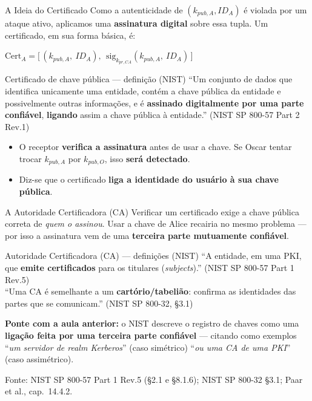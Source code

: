 \documentclass{beamer}
\begin{document}
\begin{frame}{A Ideia do Certificado}
    Como a autenticidade de $(k_{pub,A}, ID_A)$ é violada por um ataque ativo, aplicamos uma \textbf{assinatura digital} sobre essa tupla. Um certificado, em sua forma básica, é:
    \begin{tcolorbox}[colback=gray!8,colframe=gray!60!black,boxrule=0.5pt]
        \centering\footnotesize
        $\text{Cert}_A = \big[\,(k_{pub,A},\ ID_A),\ \ \mathrm{sig}_{k_{pr,CA}}(k_{pub,A},\ ID_A)\,\big]$
    \end{tcolorbox}
    \begin{block}{Certificado de chave pública --- definição (NIST)}
        \footnotesize
        ``Um conjunto de dados que identifica unicamente uma entidade, contém a chave pública da entidade e possivelmente outras informações, e é \textbf{assinado digitalmente por uma parte confiável}, \textbf{ligando} assim a chave pública à entidade.''
        \hfill {\tiny (NIST SP 800-57 Part 2 Rev.1)}
    \end{block}
    \begin{itemize}
        \footnotesize
        \item O receptor \textbf{verifica a assinatura} antes de usar a chave. Se Oscar tentar trocar $k_{pub,A}$ por $k_{pub,O}$, isso \textbf{será detectado}.
        \item Diz-se que o certificado \textbf{liga a identidade do usuário à sua chave pública}.
    \end{itemize}
\end{frame}

\begin{frame}{A Autoridade Certificadora (CA)}
    Verificar um certificado exige a chave pública correta de \emph{quem o assinou}. Usar a chave de Alice recairia no mesmo problema --- por isso a assinatura vem de uma \textbf{terceira parte mutuamente confiável}.
    \medskip
    \begin{block}{Autoridade Certificadora (CA) --- definições (NIST)}
        \footnotesize
        ``A entidade, em uma PKI, que \textbf{emite certificados} para os titulares (\textit{subjects}).'' \hfill {\tiny (NIST SP 800-57 Part 1 Rev.5)}\\[2pt]
        ``Uma CA é semelhante a um \textbf{cartório/tabelião}: confirma as identidades das partes que se comunicam.'' \hfill {\tiny (NIST SP 800-32, §3.1)}
    \end{block}
    \medskip
    \begin{tcolorbox}[colback=green!6,colframe=green!50!black,boxrule=0.5pt]
        \footnotesize
        \textbf{Ponte com a aula anterior:} o NIST descreve o registro de chaves como uma \textbf{ligação feita por uma terceira parte confiável} --- citando como exemplos ``\emph{um servidor de \textit{realm} Kerberos}'' (caso simétrico) ``\emph{ou uma CA de uma PKI}'' (caso assimétrico).
    \end{tcolorbox}
    \smallskip
    {\tiny Fonte: NIST SP 800-57 Part 1 Rev.5 (§2.1 e §8.1.6); NIST SP 800-32 §3.1; Paar et al., cap.\ 14.4.2.}
\end{frame}
\end{document}
